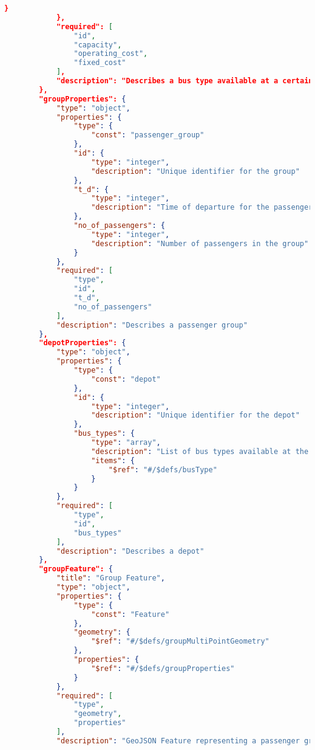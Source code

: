 \begin{lstlisting}[language=json, caption={Input GeoJSON Schema}, label={lst:jsonschema}]
                }
            },
            "required": [
                "id",
                "capacity",
                "operating_cost",
                "fixed_cost"
            ],
            "description": "Describes a bus type available at a certain depot."
        },
        "groupProperties": {
            "type": "object",
            "properties": {
                "type": {
                    "const": "passenger_group"
                },
                "id": {
                    "type": "integer",
                    "description": "Unique identifier for the group"
                },
                "t_d": {
                    "type": "integer",
                    "description": "Time of departure for the passenger group (given in seconds since the start of the simulation)"
                },
                "no_of_passengers": {
                    "type": "integer",
                    "description": "Number of passengers in the group"
                }
            },
            "required": [
                "type",
                "id",
                "t_d",
                "no_of_passengers"
            ],
            "description": "Describes a passenger group"
        },
        "depotProperties": {
            "type": "object",
            "properties": {
                "type": {
                    "const": "depot"
                },
                "id": {
                    "type": "integer",
                    "description": "Unique identifier for the depot"
                },
                "bus_types": {
                    "type": "array",
                    "description": "List of bus types available at the depot",
                    "items": {
                        "$ref": "#/$defs/busType"
                    }
                }
            },
            "required": [
                "type",
                "id",
                "bus_types"
            ],
            "description": "Describes a depot"
        },
        "groupFeature": {
            "title": "Group Feature",
            "type": "object",
            "properties": {
                "type": {
                    "const": "Feature"
                },
                "geometry": {
                    "$ref": "#/$defs/groupMultiPointGeometry"
                },
                "properties": {
                    "$ref": "#/$defs/groupProperties"
                }
            },
            "required": [
                "type",
                "geometry",
                "properties"
            ],
            "description": "GeoJSON Feature representing a passenger group"

\end{lstlisting}
